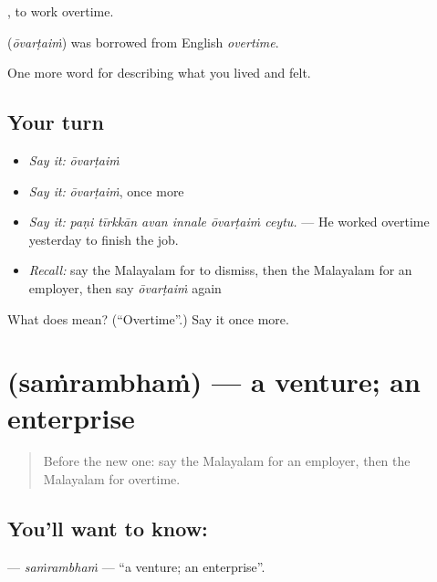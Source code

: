  , to work overtime.

\begin{cousinweb}
\textbf{} (\emph{ōvarṭaiṁ}) was borrowed from English \emph{overtime}.
\end{cousinweb}

\begin{grammarlens}[title={What you've built}]
One more word for describing what you lived and felt.
\end{grammarlens}

\subsection*{Your turn}
\begin{itemize}
\raggedright
  \item \emph{Say it:} \emph{ōvarṭaiṁ}
  \item \emph{Say it:} \emph{ōvarṭaiṁ}, once more
  \item \emph{Say it:} \emph{paṇi tīrkkān avan innale ōvarṭaiṁ ceytu.} — He worked overtime yesterday to finish the job.
  \item \emph{Recall:} say the Malayalam for to dismiss, then the Malayalam for an employer, then say \emph{ōvarṭaiṁ} again
\end{itemize}

\begin{tcolorbox}[breakable,colback=teal!4,colframe=teal!35!black,title={Before you move on}]
What does  mean? (\textquotedblleft{}Overtime\textquotedblright{}.) Say it once more.
\end{tcolorbox}
\section[\texorpdfstring{\ml{സംരംഭം} (saṁrambhaṁ)}{സംരംഭം (saṁrambhaṁ)}]{ (saṁrambhaṁ) — a venture; an enterprise}

\label{lesson:ML-C544-samrambham}



\begin{quote}
Before the new one: say the Malayalam for an employer, then the Malayalam for overtime.
\end{quote}

\subsection*{You'll want to know: }
\textbf{} — \emph{saṁrambhaṁ} — \textquotedblleft{}a venture; an enterprise\textquotedblright{}.

